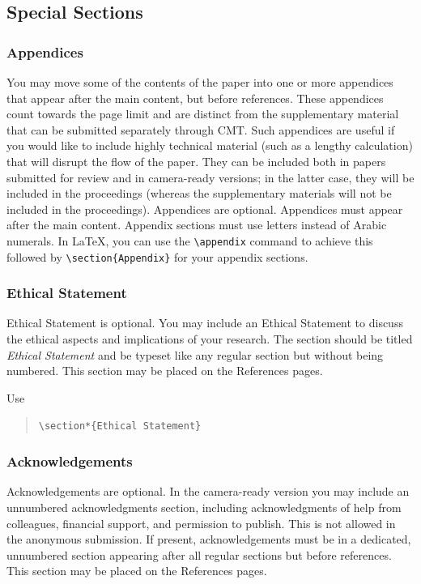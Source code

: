\documentclass{article}
\begin{document}
\subsection{Special Sections}

\subsubsection{Appendices}
You may move some of the contents of the paper into one or more appendices that appear after the main content, but before references. These appendices count towards the page limit and are distinct from the supplementary material that can be submitted separately through CMT. Such appendices are useful if you would like to include highly technical material (such as a lengthy calculation) that will disrupt the flow of the paper. They can be included both in papers submitted for review and in camera-ready versions; in the latter case, they will be included in the proceedings (whereas the supplementary materials will not be included in the proceedings).
Appendices are optional. Appendices must appear after the main content.
Appendix sections must use letters instead of Arabic numerals. In \LaTeX, you can use the {\tt \textbackslash{}appendix} command to achieve this followed by  {\tt \textbackslash section\{Appendix\}} for your appendix sections.

\subsubsection{Ethical Statement}

Ethical Statement is optional. You may include an Ethical Statement to discuss  the ethical aspects and implications of your research. The section should be titled \emph{Ethical Statement} and be typeset like any regular section but without being numbered. This section may be placed on the References pages.

Use
\begin{quote}
	{\tt \textbackslash{}section*\{Ethical Statement\}}
\end{quote}

\subsubsection{Acknowledgements}

Acknowledgements are optional. In the camera-ready version you may include an unnumbered acknowledgments section, including acknowledgments of help from colleagues, financial support, and permission to publish. This is not allowed in the anonymous submission. If present, acknowledgements must be in a dedicated, unnumbered section appearing after all regular sections but before references.  This section may be placed on the References pages.
\end{document}
